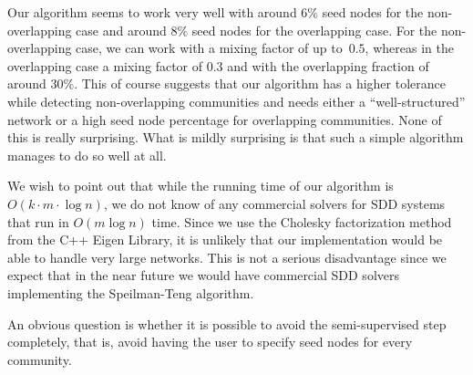 Our algorithm seems to work very well with around 6$\%$ seed nodes for the 
non-overlapping case and around 8$\%$ seed nodes for the overlapping case. 
For the non-overlapping case, we can work with a mixing factor of up 
to~$0.5$, whereas in the overlapping case a mixing factor of $0.3$ 
and with the overlapping fraction of around $30\%$. This of course 
suggests that our algorithm has a higher tolerance while detecting 
non-overlapping communities and needs either a ``well-structured''
network or a high seed node percentage for overlapping communities. 
None of this is really surprising. What is mildly surprising is that such 
a simple algorithm manages to do so well at all.

We wish to point out that while the running time of our algorithm is 
$O(k \cdot m \cdot \log n)$, we do not know of any commercial solvers 
for SDD systems that run in $O(m \log n)$ time. Since we use the Cholesky 
factorization method from the C++ Eigen Library, it is unlikely that our 
implementation would be able to handle very large networks. This is 
not a serious disadvantage since we expect that in the near future 
we would have commercial SDD solvers implementing the Speilman-Teng 
algorithm. 

An obvious question is whether it is possible to avoid the semi-supervised 
step completely, that is, avoid having the user to specify seed nodes 
for every community. 

